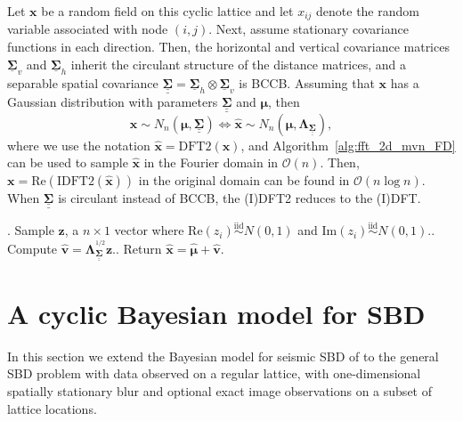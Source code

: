 \documentclass[12pt]{article}
\newcommand{\mycirc}[1] {\underline{\bm{#1}}}
\newcommand{\mybcirc}[1] {\underline{\underline{\bm{#1}}}}
\begin{document}
Let $\bm{x}$ be a random field on this cyclic lattice and let $x_{ij}$ denote the random variable associated with node $(i, j)$. 
Next, assume stationary covariance functions in each direction. Then, the horizontal and vertical covariance matrices $\mycirc{\Sigma}_v$ and $\mycirc{\Sigma}_h$ inherit the circulant structure of the distance matrices, and a separable spatial covariance $\mybcirc{\Sigma}=\mycirc{\Sigma}_h \otimes \mycirc{\Sigma}_v$
is BCCB.
Assuming that $\bm{x}$ has a Gaussian distribution with parameters $\mybcirc{\Sigma}$ and $\bm{\mu}$, then
\begin{equation}
    \bm{x}\sim N_n(\bm{\mu}, \mybcirc{\Sigma}) \iff \hat{\bm{x}} \sim N_n(\hat{\bm{\mu}}, \bm{\Lambda}_{\mybcirc{\Sigma}}),
\end{equation}
where we use the notation $\hat{\bm{x}} = \mbox{DFT2}(\bm{x})$, and Algorithm~\ref{alg:fft_2d_mvn_FD} can be used to sample $\hat{\bm{x}}$ in the Fourier domain in $\mathcal{O}(n)$. Then, $\bm{x} = \text{Re}(\mbox{IDFT2}(\hat{\bm{x}}))$ in the original domain can be found in $\mathcal{O}(n \log n)$. 
When $\mybcirc{\Sigma}$ is circulant instead of BCCB, the (I)DFT2 reduces to the (I)DFT. 

\begin{algorithm}[t]
\caption{Sampling $\hat{\bm{x}} \sim N_{n}(\hat{\bm{\mu}}, \bm{\Lambda}_{\mybcirc{\Sigma}})$ with $\hat{\bm{\mu}} = \mbox{DFT2}(\bm{\mu})$ and $\bm{\Lambda}_{\mybcirc{\Sigma}} = \mbox{diag}(\bm{\lambda}_{\mybcirc{\Sigma}})$.}
\label{alg:fft_2d_mvn_FD}
. Sample $\bm{z}$, a $n \times 1$ vector where $\text{Re}(z_{i}) \stackrel{\text{iid}}{\sim} N(0, 1)$ and $\text{Im}(z_{i}) \stackrel{\text{iid}}{\sim} N(0, 1)$.. Compute $\hat{\bm{v}} = \bm{\Lambda}_{\mybcirc{\Sigma}}^{^{1/2}} \bm{z}$.. Return $\hat{\bm{x}} = \hat{\bm{\mu}} + \hat{\bm{v}}$.\;
\end{algorithm}

\section{A cyclic Bayesian model for SBD} \label{sec:model}
In this section we extend the Bayesian model for seismic SBD of \citet{Senn2025} to the general SBD problem with data observed on a regular lattice, with one-dimensional spatially stationary blur and optional exact image observations on a subset of lattice locations.
\end{document}
